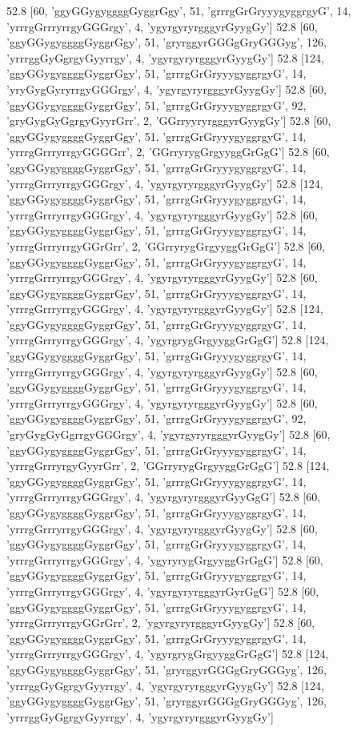 52.8 [60, 'ggyGGygyggggGyggrGgy', 51, 'grrrgGrGryyygyggrgyG', 14, 'yrrrgGrrryrrgyGGGrgy', 4, 'ygyrgyryrgggyrGyygGy']
52.8 [60, 'ggyGGygyggggGyggrGgy', 51, 'gryrggyrGGGgGryGGGyg', 126, 'yrrrggGyGgrgyGyyrrgy', 4, 'ygyrgyryrgggyrGyygGy']
52.8 [124, 'ggyGGygyggggGyggrGgy', 51, 'grrrgGrGryyygyggrgyG', 14, 'yryGygGyryrrgyGGGrgy', 4, 'ygyrgyryrgggyrGyygGy']
52.8 [60, 'ggyGGygyggggGyggrGgy', 51, 'grrrgGrGryyygyggrgyG', 92, 'gryGygGyGgrgyGyyrGrr', 2, 'GGrryyryrgggyrGyygGy']
52.8 [60, 'ggyGGygyggggGyggrGgy', 51, 'grrrgGrGryyygyggrgyG', 14, 'yrrrgGrrryrrgyGGGGrr', 2, 'GGrryrygGrgyyggGrGgG']
52.8 [60, 'ggyGGygyggggGyggrGgy', 51, 'grrrgGrGryyygyggrgyG', 14, 'yrrrgGrrryrrgyGGGrgy', 4, 'ygyrgyryrgggyrGyygGy']
52.8 [124, 'ggyGGygyggggGyggrGgy', 51, 'grrrgGrGryyygyggrgyG', 14, 'yrrrgGrrryrrgyGGGrgy', 4, 'ygyrgyryrgggyrGyygGy']
52.8 [60, 'ggyGGygyggggGyggrGgy', 51, 'grrrgGrGryyygyggrgyG', 14, 'yrrrgGrrryrrgyGGrGrr', 2, 'GGrryrygGrgyyggGrGgG']
52.8 [60, 'ggyGGygyggggGyggrGgy', 51, 'grrrgGrGryyygyggrgyG', 14, 'yrrrgGrrryrrgyGGGrgy', 4, 'ygyrgyryrgggyrGyygGy']
52.8 [60, 'ggyGGygyggggGyggrGgy', 51, 'grrrgGrGryyygyggrgyG', 14, 'yrrrgGrrryrrgyGGGrgy', 4, 'ygyrgyryrgggyrGyygGy']
52.8 [124, 'ggyGGygyggggGyggrGgy', 51, 'grrrgGrGryyygyggrgyG', 14, 'yrrrgGrrryrrgyGGGrgy', 4, 'ygyrgrygGrgyyggGrGgG']
52.8 [124, 'ggyGGygyggggGyggrGgy', 51, 'grrrgGrGryyygyggrgyG', 14, 'yrrrgGrrryrrgyGGGrgy', 4, 'ygyrgyryrgggyrGyygGy']
52.8 [60, 'ggyGGygyggggGyggrGgy', 51, 'grrrgGrGryyygyggrgyG', 14, 'yrrrgGrrryrrgyGGGrgy', 4, 'ygyrgyryrgggyrGyygGy']
52.8 [60, 'ggyGGygyggggGyggrGgy', 51, 'grrrgGrGryyygyggrgyG', 92, 'gryGygGyGgrrgyGGGrgy', 4, 'ygyrgyryrgggyrGyygGy']
52.8 [60, 'ggyGGygyggggGyggrGgy', 51, 'grrrgGrGryyygyggrgyG', 14, 'yrrrgGrrryrgyGyyrGrr', 2, 'GGrryrygGrgyyggGrGgG']
52.8 [124, 'ggyGGygyggggGyggrGgy', 51, 'grrrgGrGryyygyggrgyG', 14, 'yrrrgGrrryrrgyGGGrgy', 4, 'ygyrgyryrgggyrGyyGgG']
52.8 [60, 'ggyGGygyggggGyggrGgy', 51, 'grrrgGrGryyygyggrgyG', 14, 'yrrrgGrrryrrgyGGGrgy', 4, 'ygyrgyryrgggyrGyygGy']
52.8 [60, 'ggyGGygyggggGyggrGgy', 51, 'grrrgGrGryyygyggrgyG', 14, 'yrrrgGrrryrrgyGGGrgy', 4, 'ygyryrygGrgyyggGrGgG']
52.8 [60, 'ggyGGygyggggGyggrGgy', 51, 'grrrgGrGryyygyggrgyG', 14, 'yrrrgGrrryrrgyGGGrgy', 4, 'ygyrgyryrgggyrGyrGgG']
52.8 [60, 'ggyGGygyggggGyggrGgy', 51, 'grrrgGrGryyygyggrgyG', 14, 'yrrrgGrrryrrgyGGrGrr', 2, 'ygyrgyryrgggyrGyygGy']
52.8 [60, 'ggyGGygyggggGyggrGgy', 51, 'grrrgGrGryyygyggrgyG', 14, 'yrrrgGrrryrrgyGGGrgy', 4, 'ygyrgrygGrgyyggGrGgG']
52.8 [124, 'ggyGGygyggggGyggrGgy', 51, 'gryrggyrGGGgGryGGGyg', 126, 'yrrrggGyGgrgyGyyrrgy', 4, 'ygyrgyryrgggyrGyygGy']
52.8 [124, 'ggyGGygyggggGyggrGgy', 51, 'gryrggyrGGGgGryGGGyg', 126, 'yrrrggGyGgrgyGyyrrgy', 4, 'ygyrgyryrgggyrGyygGy']
